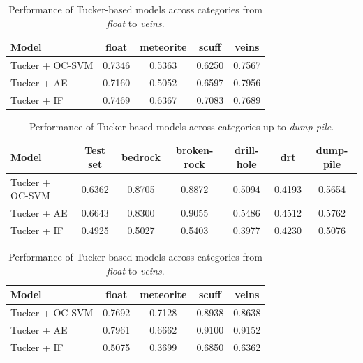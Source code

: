\documentclass[11pt]{article}
\begin{document}
\begin{table}[H]
\centering
\begin{tabular}{lcccc}
\hline
\textbf{Model} & \textbf{float} & \textbf{meteorite} & \textbf{scuff} & \textbf{veins} \\
\hline
Tucker + OC-SVM & 0.7346 & 0.5363 & 0.6250 & 0.7567 \\
Tucker + AE     & 0.7160 & 0.5052 & 0.6597 & 0.7956 \\
Tucker + IF     & 0.7469 & 0.6367 & 0.7083 & 0.7689 \\
\hline
\end{tabular}
\caption{Performance of Tucker-based models across categories from \textit{float} to \textit{veins}.}
\label{tab:results_inOrder_tucker_part2}
\end{table}

\begin{table}[H]
\centering
\begin{tabular}{lcccccc}
\hline
\textbf{Model} & \textbf{Test set} & \textbf{bedrock} & \textbf{broken-rock} & \textbf{drill-hole} & \textbf{drt} & \textbf{dump-pile} \\
\hline
Tucker + OC-SVM & 0.6362 & 0.8705 & 0.8872 & 0.5094 & 0.4193 & 0.5654 \\
Tucker + AE     & 0.6643 & 0.8300 & 0.9055 & 0.5486 & 0.4512 & 0.5762 \\
Tucker + IF     & 0.4925 & 0.5027 & 0.5403 & 0.3977 & 0.4230 & 0.5076 \\
\hline
\end{tabular}
\caption{Performance of Tucker-based models across categories up to \textit{dump-pile}.}
\label{tab:results_random_tucker_part1}
\end{table}

\begin{table}[H]
\centering
\begin{tabular}{lcccc}
\hline
\textbf{Model} & \textbf{float} & \textbf{meteorite} & \textbf{scuff} & \textbf{veins} \\
\hline
Tucker + OC-SVM & 0.7692 & 0.7128 & 0.8938 & 0.8638 \\
Tucker + AE     & 0.7961 & 0.6662 & 0.9100 & 0.9152 \\
Tucker + IF     & 0.5075 & 0.3699 & 0.6850 & 0.6362 \\
\hline
\end{tabular}
\caption{Performance of Tucker-based models across categories from \textit{float} to \textit{veins}.}
\label{tab:results_random_tucker_part2}
\end{table}
\end{document}
